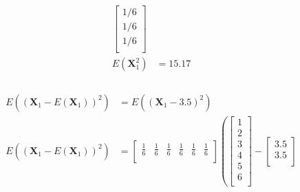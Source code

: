 \documentclass[12pt,letterpaper, onecolumn]{exam}
\begin{document}
\begin{questions}
\begin{parts}
{\begin{subparts}
\begin{equation}
\begin{split}
\begin{bmatrix}
                                        1/6\\
                                        1/6\\
                                        1/6\\
                                    \end{bmatrix}\\
                                    E(\mathbf{X}_1^2) & = 15.17\\
                                \end{split}
                            \end{equation}
                    \\
                        \solution
                            \begin{equation}
                                \begin{split}
                                    E\left((\mathbf{X}_1 - E(\mathbf{X}_1))^2\right) & = E\left((\mathbf{X}_1 - 3.5)^2\right)\\
                                    E\left((\mathbf{X}_1 - E(\mathbf{X}_1))^2\right) & =                                     
                                    \begin{bmatrix}
                                        \frac{1}{6} & \frac{1}{6} & \frac{1}{6} & \frac{1}{6} & \frac{1}{6} & \frac{1}{6}\\    
                                    \end{bmatrix}
                                    \left(
                                    \begin{bmatrix}
                                        1\\
                                        2\\
                                        3\\
                                        4\\
                                        5\\
                                        6\\
                                    \end{bmatrix} -
                                    \begin{bmatrix}
                                        3.5\\
                                        3.5\\

\end{bmatrix}
\end{split}
\end{equation}
\end{subparts}}
\end{parts}
\end{questions}
\end{document}
